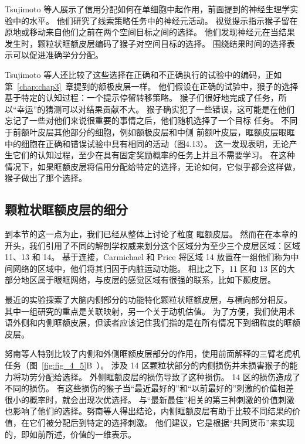 Tsujimoto 等人\cite{tsujimoto2009monkey}展示了信用分配如何在单细胞中起作用，前面提到的神经生理学实验中的水平。
他们研究了线索策略任务中的神经元活动。
视觉提示指示猴子留在原地或移动来自他们之前在两个空间目标之间的选择。
他们发现神经元在当结果发生时，颗粒状眶额皮层编码了猴子对空间目标的选择。
围绕结果时间的选择表示可以促进准确学分分配。\par


Tsujimoto 等人还比较了这些选择在正确和不正确执行的试验中的编码，正如第~\ref{chap:chap3}~章提到的额极皮层一样。
他们假设在正确的试验中，猴子的选择基于特定的认知过程：一个提示停留转移策略。
猴子们很好地完成了任务，所以“幸运”的猜测可以对结果贡献不大。
猴子确实犯了一些错误，这可能是在他们忘记了一些对他们来说很重要的事情之后，他们随机选择了一个目标
任务。
不同于前额叶皮层其他部分的细胞，例如额极皮层和中侧 前额叶皮层，眶额皮层眼眶中的细胞在正确和错误试验中具有相同的活动（图4.13）。
这一发现表明，无论产生它们的认知过程，至少在具有固定奖励概率的任务上并且不需要学习\cite{tsujimoto2011frontal}。
在这种情况下，如果眶额皮层将信用分配给特定的选择，无论如何，它似乎都会这样做，猴子做出了那个选择。\par



\subsection{颗粒状眶额皮层的细分}

到本节的这一点为止，我们已经从整体上讨论了粒度 眶额皮层。
然而在在本章的开头，我们引用了不同的解剖学权威来划分这个区域分为至少三个皮层区域：区域 11、13 和 14。
基于连接，Carmichael 和 Price 将区域 14 放置在一组他们称为中间网络的区域中，他们将其归因于内脏运动功能。
相比之下，11 区和 13 区的大部分地区属于眼眶网络，与皮层的感觉区域有很强的联系，比如下颞皮层。\par


最近的实验探索了大脑内侧部分的功能特化颗粒状眶额皮层，与横向部分相反。
其中一组研究的重点是关联映射，另一个关于动机估值。
为了方便，我们使用术语外侧和内侧眶额皮层，但读者应该记住我们指的是在所有情况下到细粒度的眶额皮层。\par


努南等人\cite{noonan2010separate}特别比较了内侧和外侧眶额皮层部分的作用，使用前面解释的三臂老虎机任务（图~\ref{fig:fig_4_5}B~）。
涉及 14 区颗粒状部分的内侧损伤并未损害猴子的能力将功劳分配给选择。
外侧眶额皮层的损伤导致了这种损伤。
14 区的损伤造成了不同的损伤。
有这些损伤的猴子当“最近最好的”和“以前最好的”刺激的价值相差很小的概率时，就会出现次优选择。
与“最新最佳”相关的第三种刺激的价值刺激也影响了他们的选择。努南等人得出结论，内侧眶额皮层有助于比较不同结果的价值，在它们被分配后到特定的选择刺激。
他们建议，它是根据“共同货币”来实现的，即如前所述，价值的一维表示。\par


